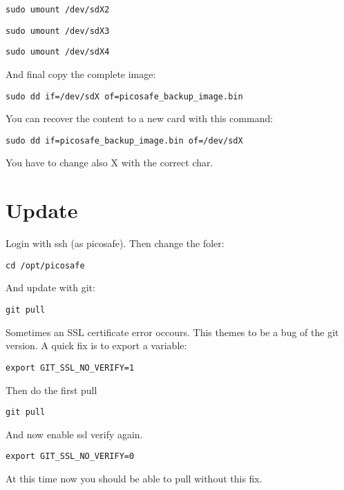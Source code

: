 \texttt{sudo umount /dev/sdX2}

\texttt{sudo umount /dev/sdX3}

\texttt{sudo umount /dev/sdX4}

And final copy the complete image:

\texttt{sudo dd if=/dev/sdX of=picosafe\_backup\_image.bin}


You can recover the content to a new card with this command:

\texttt{sudo dd if=picosafe\_backup\_image.bin of=/dev/sdX}

You have to change also X with the correct char.




\section{Update}


Login with ssh (as picosafe). Then change the foler:


\texttt{cd /opt/picosafe}

And update with git:

\texttt{git pull}


Sometimes an SSL certificate error occours. This themes to be a bug of the git version. A quick fix is to export a variable:

\texttt{export GIT\_SSL\_NO\_VERIFY=1}

Then do the first pull

\texttt{git pull}

And now enable ssl verify again.

\texttt{export GIT\_SSL\_NO\_VERIFY=0}

At this time now you should be able to pull without this fix.
